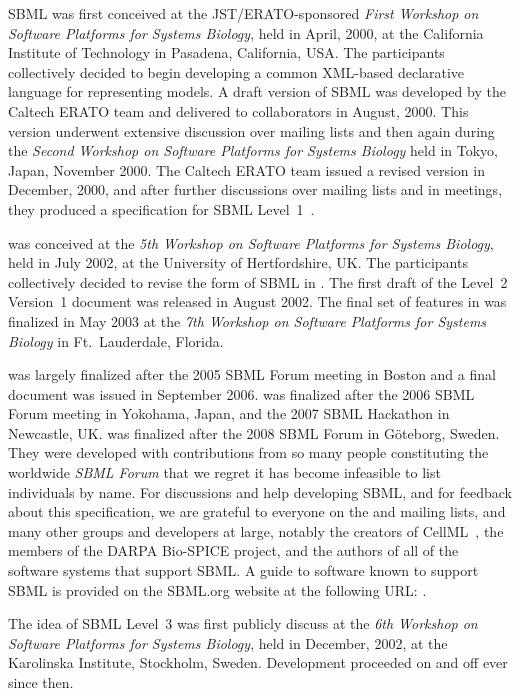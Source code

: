 SBML was first conceived at the JST/ERATO-sponsored \emph{First
  Workshop on Software Platforms for Systems Biology}, held in
April, 2000, at the California Institute of Technology in
Pasadena, California, USA.  The participants collectively decided
to begin developing a common XML-based declarative language for
representing models.  A draft version of SBML was developed by the
Caltech ERATO team and delivered to collaborators in August, 2000.
This version underwent extensive discussion over mailing lists and
then again during the \emph{Second Workshop on Software Platforms
  for Systems Biology} held in Tokyo, Japan, November 2000.  The
Caltech ERATO team issued a revised version in December, 2000, and
after further discussions over mailing lists and in meetings, they
produced a specification for SBML Level~1~\citep{hucka:2001}.

\sbmltwo was conceived at the \emph{5th Workshop on Software
  Platforms for Systems Biology}, held in July 2002, at the
University of Hertfordshire, UK.  The participants collectively
decided to revise the form of SBML in \sbmltwo.  The first draft
of the Level~2 Version~1 document was released in August 2002. The
final set of features in \sbmltwoone was finalized in May 2003 at
the \emph{7th Workshop on Software Platforms for Systems Biology}
in Ft.\ Lauderdale, Florida.

\sbmltwotwo was largely finalized after the 2005 SBML Forum
meeting in Boston and a final document was issued in September
2006.  \sbmltwothree was finalized after the 2006 SBML Forum
meeting in Yokohama, Japan, and the 2007 SBML Hackathon in
Newcastle, UK.  \sbmltwofour was finalized after the 2008 SBML
Forum in G\"{o}teborg, Sweden.  They were developed with
contributions from so many people constituting the worldwide
\emph{SBML Forum} that we regret it has become infeasible to list
individuals by name.  For discussions and help developing SBML,
and for feedback about this specification, we are grateful to
everyone on the
 and
mailing lists, and many other groups and developers at large,
notably the creators of CellML~\citep{hedley:2001b}, the members
of the DARPA Bio-SPICE project, and the authors of all of the
software systems that support SBML.  A guide to software known to
support SBML is provided on the SBML.org website at the following
URL:
.

The idea of SBML Level~3 was first publicly discuss at
the \emph{6th Workshop on Software Platforms for Systems Biology},
held in December, 2002, at the Karolinska Institute, Stockholm,
Sweden.  Development proceeded on and off ever since then.
